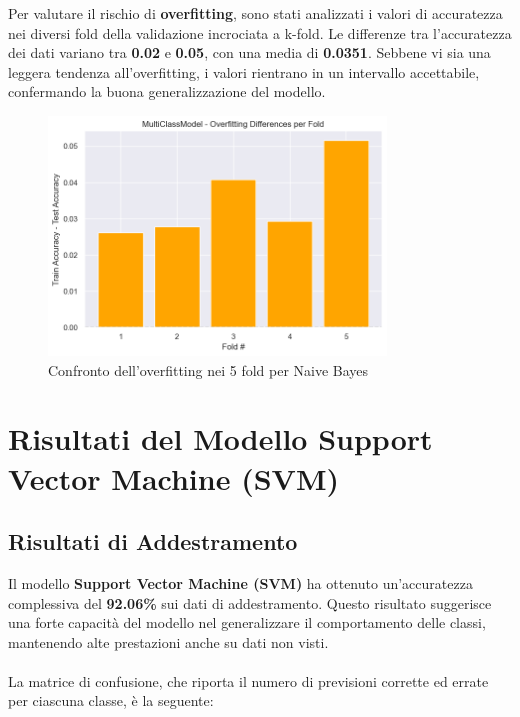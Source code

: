 Per valutare il rischio di \textbf{overfitting}, sono stati analizzati i valori di accuratezza nei diversi fold della validazione incrociata a k-fold. Le differenze tra l'accuratezza dei dati variano tra \textbf{0.02} e \textbf{0.05}, con una media di \textbf{0.0351}. Sebbene vi sia una leggera tendenza all'overfitting, i valori rientrano in un intervallo accettabile, confermando la buona generalizzazione del modello.

\begin{figure}[H]
    \centering
    \includegraphics[width=0.8\textwidth]{images/overfitting_naive_bayes.png}
    \caption{Confronto dell'overfitting nei 5 fold per Naive Bayes}
    \label{fig:overfitting_naive_bayes}
\end{figure}

\newpage

\section{Risultati del Modello Support Vector Machine (SVM)}

\subsection{Risultati di Addestramento}

Il modello \textbf{Support Vector Machine (SVM)} ha ottenuto un'accuratezza complessiva del \textbf{92.06\%} sui dati di addestramento. Questo risultato suggerisce una forte capacità del modello nel generalizzare il comportamento delle classi, mantenendo alte prestazioni anche su dati non visti. \\ \\
La matrice di confusione, che riporta il numero di previsioni corrette ed errate per ciascuna classe, è la seguente:

